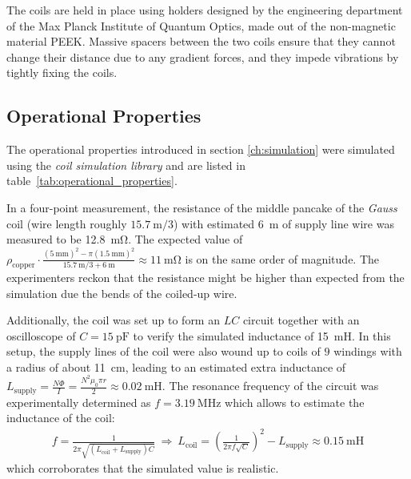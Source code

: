 The coils are held in place using holders designed by the engineering department of the Max Planck Institute of Quantum Optics, made out of the non-magnetic material PEEK. Massive spacers between the two coils ensure that they cannot change their distance due to any gradient forces, and they impede vibrations by tightly fixing the coils.

\subsection*{Operational Properties}
The operational properties introduced in section \ref{ch:simulation} were simulated using the \textit{coil simulation library} and are listed in table~\ref{tab:operational_properties}.

In a four-point measurement, the resistance of the middle pancake of the \textit{Gauss} coil (wire length roughly $\SI{15.7}{\meter}/3$) with estimated \SI{6}{\meter} of supply line wire was measured to be \SI{12.8}{\milli\ohm}. The expected value of $\rho_\text{copper} \cdot \frac{(\SI{5}{\milli\meter})^2 - \pi(\SI{1.5}{\milli\meter})^2}{\SI{15.7}{\meter}/3 + \SI{6}{\meter}} \approx \SI{11}{\milli\ohm}$ is on the same order of magnitude. The experimenters reckon that the resistance might be higher than expected from the simulation due the bends of the coiled-up wire.

Additionally, the coil was set up to form an $LC$ circuit together with an oscilloscope of $C = \SI{15}{\pico\farad}$ to verify the simulated inductance of \SI{15}{\milli\henry}. In this setup, the supply lines of the coil were also wound up to coils of $9$ windings with a radius of about \SI{11}{\centi\meter}, leading to an estimated extra inductance of $L_\text{supply} = \frac{N\Phi}{I} = \frac{N^2\mu_0\pi r}{2} \approx \SI{0.02}{\milli\henry}$. The resonance frequency of the circuit was experimentally determined as $f = \SI{3.19}{\mega\hertz}$ which allows to estimate the inductance of the coil:
\begin{align}
    f = \frac{1}{2\pi \sqrt{(L_\text{coil} + L_\text{supply})C}} ~\Rightarrow~ L_\text{coil} = \left(\frac{1}{2\pi f \sqrt{C}}\right)^2 - L_\text{supply} \approx \SI{0.15}{\milli\henry}
\end{align}
which corroborates that the simulated value is realistic.


